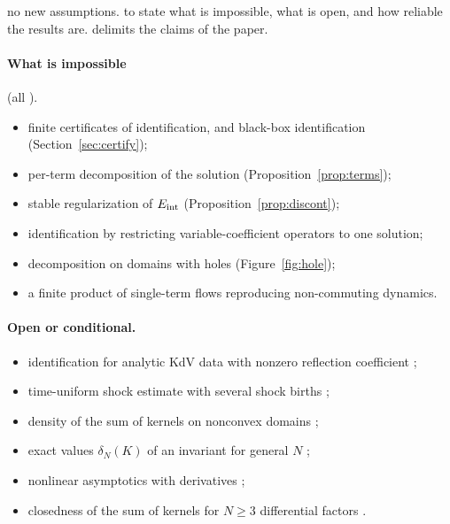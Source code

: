 \sectionbrief
{no new assumptions.}
{to state what is impossible, what is open, and how reliable the results are.}
{delimits the claims of the paper.}
\paragraph{What is impossible} (all \proved).
\begin{itemize}[nosep]
\item finite certificates of identification, and black-box identification (Section~\ref{sec:certify});
\item per-term decomposition of the solution (Proposition~\ref{prop:terms});
\item stable regularization of $E_{\mathrm{int}}$ (Proposition~\ref{prop:discont});
\item identification by restricting variable-coefficient operators to one solution;
\item decomposition on domains with holes (Figure~\ref{fig:hole});
\item a finite product of single-term flows reproducing non-commuting dynamics.
\end{itemize}

\paragraph{Open or conditional.}
\begin{itemize}[nosep]
\item identification for analytic KdV data with nonzero reflection coefficient  \openq;
\item time-uniform shock estimate with several shock births  \condl;
\item density of the sum of kernels on nonconvex domains \openq;
\item exact values $\delta_N(K)$ of an invariant for general $N$  \openq;
\item nonlinear asymptotics with derivatives  \condl;
\item closedness of the sum of kernels for $N\ge3$ differential factors  \openq.
\end{itemize}

